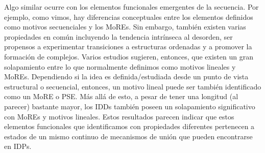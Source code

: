 % 
Algo similar ocurre con los elementos funcionales emergentes de la secuencia.
Por ejemplo, como vimos, hay diferencias conceptuales entre los elementos definidos como motivos secuenciales y los MoREs. 
Sin embargo, también existen varias propiedades en común incluyendo la tendencia intrínseca al desorden, ser propensos a experimentar transiciones a estructuras ordenadas y a promover la formación de complejos. 
Varios estudios sugieren, entonces, que existen un gran solapamiento entre lo que normalmente definimos como motivos lineales y MoREs\cite{fuxreiter2007local,meszaros2012disordered}.
Dependiendo si la idea es definida/estudiada desde un punto de vista estructural o secuencial, entonces, un motivo lineal puede ser también identificado como un MoRE o PSE.
Más allá de esto, a pesar de tener una longitud (al parecer) bastante mayor, los IDDs también poseen un solapamiento significativo con MoREs y motivos lineales.
Estos resultados parecen indicar que estos elementos funcionales que identificamos con propiedades diferentes pertenecen a estados de un mismo continuo de mecanismos de unión que pueden encontrarse en IDPs.



